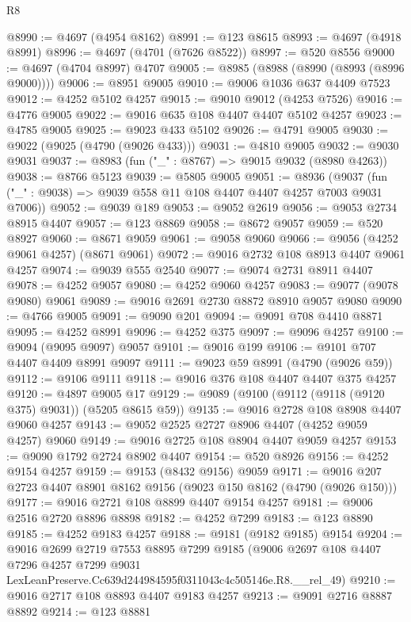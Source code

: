 \begin{lexlean}{R8}
\begin{coremodule}
@8990 := @4697 (@4954 @8162)
@8991 := @123 @8615
@8993 := @4697 (@4918 @8991)
@8996 := @4697 (@4701 (@7626 @8522))
@8997 := @520 @8556
@9000 := @4697 (@4704 @8997) @4707
@9005 := @8985 (@8988 (@8990 (@8993 (@8996 @9000))))
@9006 := @8951 @9005
@9010 := @9006 @1036 @637 @4409 @7523
@9012 := @4252 @5102 @4257
@9015 := @9010 @9012 (@4253 @7526)
@9016 := @4776 @9005
@9022 := @9016 @635 @108 @4407 @4407 @5102 @4257
@9023 := @4785 @9005
@9025 := @9023 @433 @5102
@9026 := @4791 @9005
@9030 := @9022 (@9025 (@4790 (@9026 @433)))
@9031 := @4810 @9005
@9032 := @9030 @9031
@9037 := @8983 (fun ("_" : @8767) => @9015 @9032 (@8980 @4263))
@9038 := @8766 @5123
@9039 := @5805 @9005
@9051 := @8936
    (@9037 (fun ("_" : @9038) => @9039 @558 @11 @108 @4407 @4407 @4257 @7003 @9031 @7006))
@9052 := @9039 @189
@9053 := @9052 @2619
@9056 := @9053 @2734 @8915 @4407
@9057 := @123 @8869
@9058 := @8672 @9057
@9059 := @520 @8927
@9060 := @8671 @9059
@9061 := @9058 @9060
@9066 := @9056 (@4252 @9061 @4257) (@8671 @9061)
@9072 := @9016 @2732 @108 @8913 @4407 @9061 @4257
@9074 := @9039 @555 @2540
@9077 := @9074 @2731 @8911 @4407
@9078 := @4252 @9057
@9080 := @4252 @9060 @4257
@9083 := @9077 (@9078 @9080) @9061
@9089 := @9016 @2691 @2730 @8872 @8910 @9057 @9080
@9090 := @4766 @9005
@9091 := @9090 @201
@9094 := @9091 @708 @4410 @8871
@9095 := @4252 @8991
@9096 := @4252 @375
@9097 := @9096 @4257
@9100 := @9094 (@9095 @9097) @9057
@9101 := @9016 @199
@9106 := @9101 @707 @4407 @4409 @8991 @9097
@9111 := @9023 @59 @8991 (@4790 (@9026 @59))
@9112 := @9106 @9111
@9118 := @9016 @376 @108 @4407 @4407 @375 @4257
@9120 := @4897 @9005 @17
@9129 := @9089 (@9100 (@9112 (@9118 (@9120 @375) @9031)) (@5205 @8615 @59))
@9135 := @9016 @2728 @108 @8908 @4407 @9060 @4257
@9143 := @9052 @2525 @2727 @8906 @4407 (@4252 @9059 @4257) @9060
@9149 := @9016 @2725 @108 @8904 @4407 @9059 @4257
@9153 := @9090 @1792 @2724 @8902 @4407
@9154 := @520 @8926
@9156 := @4252 @9154 @4257
@9159 := @9153 (@8432 @9156) @9059
@9171 := @9016 @207 @2723 @4407 @8901 @8162 @9156 (@9023 @150 @8162 (@4790 (@9026 @150)))
@9177 := @9016 @2721 @108 @8899 @4407 @9154 @4257
@9181 := @9006 @2516 @2720 @8896 @8898
@9182 := @4252 @7299
@9183 := @123 @8890
@9185 := @4252 @9183 @4257
@9188 := @9181 (@9182 @9185) @9154
@9204 := @9016
    @2699
    @2719
    @7553
    @8895
    @7299
    @9185
    (@9006
      @2697
      @108
      @4407
      @7296
      @4257
      @7299
      @9031
      LexLeanPreserve.Cc639d244984595f0311043c4c505146e.R8.__rel_49)
@9210 := @9016 @2717 @108 @8893 @4407 @9183 @4257
@9213 := @9091 @2716 @8887 @8892
@9214 := @123 @8881

\end{coremodule}
\end{lexlean}
